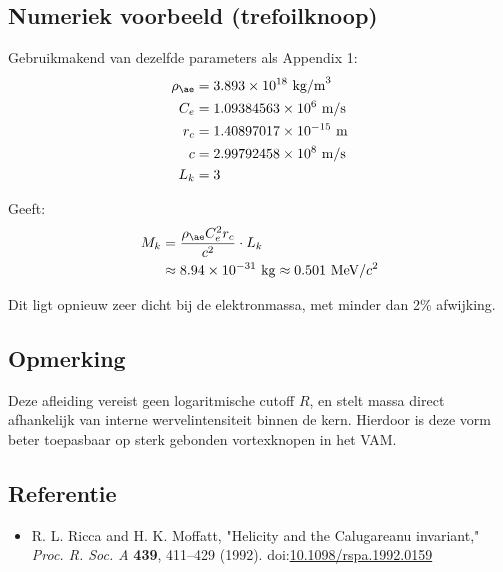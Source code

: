\subsection*{Numeriek voorbeeld (trefoilknoop)}
Gebruikmakend van dezelfde parameters als Appendix 1:
\begin{align*}
    \rho_{\ae} &= 3.893 \times 10^{18}~\text{kg/m}^3 \\
    C_e &= 1.09384563 \times 10^6~\text{m/s} \\
    r_c &= 1.40897017 \times 10^{-15}~\text{m} \\
    c &= 2.99792458 \times 10^8~\text{m/s} \\
    L_k &= 3
\end{align*}

Geeft:
\begin{align*}
    M_k &= \frac{\rho_{\ae} C_e^2 r_c}{c^2} \cdot L_k \\
    &\approx 8.94 \times 10^{-31}~\text{kg} \approx 0.501~\text{MeV}/c^2
\end{align*}

Dit ligt opnieuw zeer dicht bij de elektronmassa, met minder dan 2\% afwijking.

\subsection*{Opmerking}
Deze afleiding vereist geen logaritmische cutoff \( R \), en stelt massa direct afhankelijk van interne wervelintensiteit binnen de kern. Hierdoor is deze vorm beter toepasbaar op sterk gebonden vortexknopen in het VAM.

\subsection*{Referentie}
\begin{itemize}
    \item R. L. Ricca and H. K. Moffatt, "Helicity and the Calugareanu invariant," \textit{Proc. R. Soc. A} \textbf{439}, 411--429 (1992). doi:\href{https://doi.org/10.1098/rspa.1992.0159}{10.1098/rspa.1992.0159}
\end{itemize}